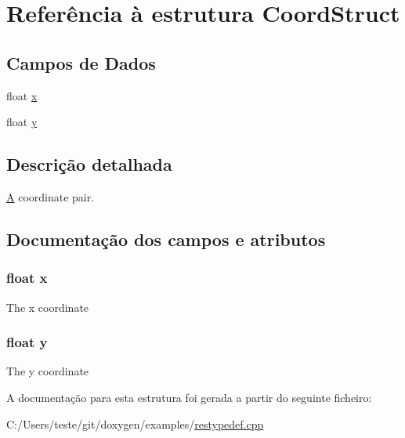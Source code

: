 \hypertarget{struct_coord_struct}{\section{Referência à estrutura Coord\-Struct}
\label{struct_coord_struct}
}
\subsection*{Campos de Dados}
\begin{DoxyCompactItemize}
\item 
float \hyperlink{struct_coord_struct_ad0da36b2558901e21e7a30f6c227a45e}{x}
\item 
float \hyperlink{struct_coord_struct_aa4f0d3eebc3c443f9be81bf48561a217}{y}
\end{DoxyCompactItemize}


\subsection{Descrição detalhada}
\hyperlink{class_a}{A} coordinate pair. 

\subsection{Documentação dos campos e atributos}
\hypertarget{struct_coord_struct_ad0da36b2558901e21e7a30f6c227a45e}{
\subsubsection[{x}]{\setlength{\rightskip}{0pt plus 5cm}float x}}\label{struct_coord_struct_ad0da36b2558901e21e7a30f6c227a45e}
The x coordinate \hypertarget{struct_coord_struct_aa4f0d3eebc3c443f9be81bf48561a217}{
\subsubsection[{y}]{\setlength{\rightskip}{0pt plus 5cm}float y}}\label{struct_coord_struct_aa4f0d3eebc3c443f9be81bf48561a217}
The y coordinate 

A documentação para esta estrutura foi gerada a partir do seguinte ficheiro\-:\begin{DoxyCompactItemize}
\item 
C\-:/\-Users/teste/git/doxygen/examples/\hyperlink{restypedef_8cpp}{restypedef.\-cpp}\end{DoxyCompactItemize}

